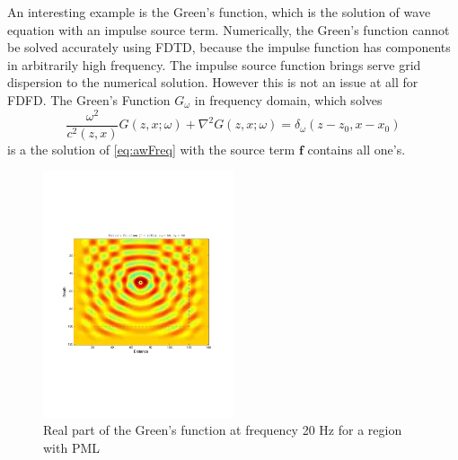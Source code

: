 \documentclass[11pt,titlepage]{article}
\newcommand{\bff}{\boldsymbol{f}}
\theoremstyle{plain}
\theoremstyle{definition}
\theoremstyle{remark}
\numberwithin{equation}{section}
\begin{document}
An interesting example is the Green's function, which is the solution of wave equation with an impulse source term. Numerically, the Green's function cannot be solved accurately using FDTD, because the impulse function has components in arbitrarily high frequency. The impulse source function brings serve grid dispersion to the numerical solution. However this is not an issue at all for FDFD. The Green's Function $G_{\omega}$ in frequency domain, which solves  
  \begin{equation}
  \frac{\omega^2}{c^2(z, x)}G(z, x;\omega) + \nabla^2 G(z, x;\omega) = \delta_{\omega}(z-z_0, x-x_0)
  \end{equation}
  is a the solution of \eqref{eq:awFreq} with the source term $\bff$ contains all one's.
  
\begin{figure}[htbp]
\centering
\includegraphics[width=0.5\textwidth]{Fig/GreensFunction.pdf}
\caption{Real part of the Green's function at frequency 20 Hz for a region with PML} 
\end{figure}
\end{document}
